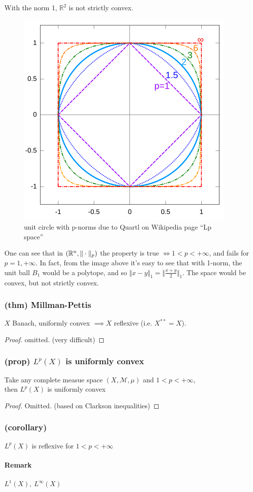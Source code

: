With the norm 1, $\mathbb R^2$ is not strictly convex.
\begin{figure}[H]
        \centering
        \includegraphics[width=0.4\linewidth]{assets/p-norms_unit_circle_R^2.png}
        \caption{unit circle with p-norms due to Quartl on Wikipedia page “Lp space”}
        \label{fig:enter-label}
    \end{figure}
One can see that in $(\mathbb R^n,\Vert \cdot \Vert_p)$ the property is true $\iff 1<p<+\infty$, and fails for $p=1,+\infty$. In fact, from the image above it's easy to see that with 1-norm, the unit ball $B_1$ would be a polytope, and so $\Vert x-y\Vert_1 = \Vert \frac {x+y}2\Vert_1$. The space would be convex, but not strictly convex.

\subsubsection{(thm) Millman-Pettis}
$X$ Banach, uniformly convex $\implies X$ reflexive (i.e. $X^{**}=X$).
\begin{proof}
    omitted. (very difficult)
\end{proof}
\subsubsection{(prop) $L^p(X)$ is uniformly convex}
Take any complete measue space $(X,\mathcal M,\mu)$ and $1<p<+\infty$,\\
then $L^p(X)$ is uniformly convex
\begin{proof}
    Omitted. (based on Clarkson inequalities)
\end{proof}
\subsubsection{(corollary)}
$L^p(X)$ is reflexive for $1<p<+\infty$
\paragraph{Remark}
$L^1(X),\ L^\infty(X)$ 
